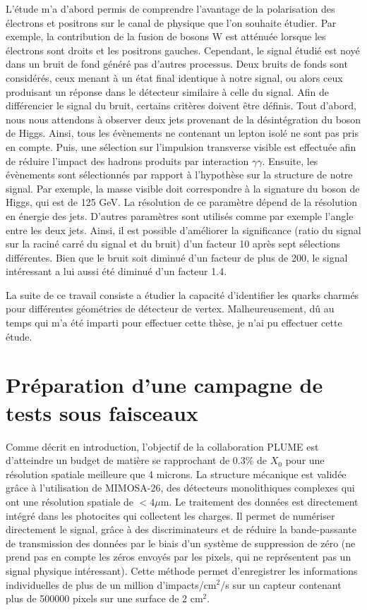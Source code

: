 \documentclass[a4papper, 10pt]{article}
\begin{document}
  L'étude m'a d'abord permis de comprendre l'avantage de la polarisation des électrons et positrons sur le canal de physique que l'on souhaite étudier.
  Par exemple, la contribution de la fusion de bosons W est atténuée lorsque les électrons sont droits et les positrons gauches.
  Cependant, le signal étudié est noyé dans un bruit de fond généré pas d'autres processus.
  Deux bruits de fonds sont considérés, ceux menant à un état final identique à notre signal, ou alors ceux produisant un réponse dans le détecteur similaire à celle du signal.
  Afin de différencier le signal du bruit, certains critères doivent être définis.
  Tout d'abord, nous nous attendons à observer deux jets provenant de la désintégration du boson de Higgs. 
  Ainsi, tous les évènements ne contenant un lepton isolé ne sont pas pris en compte.
  Puis, une sélection sur l'impulsion transverse visible est effectuée afin de réduire l'impact des hadrons produits par interaction $\gamma\gamma$.
  Ensuite, les évènements sont sélectionnés par rapport à l'hypothèse sur la structure de notre signal.
  Par exemple, la masse visible doit correspondre à la signature du boson de Higgs, qui est de 125 GeV.
  La résolution de ce paramètre dépend de la résolution en énergie des jets. 
  D'autres paramètres sont utilisés comme par exemple l'angle entre les deux jets.
  Ainsi, il est possible d'améliorer la significance (ratio du signal sur la raciné carré du signal et du bruit) d'un facteur 10 après sept sélections différentes.
  Bien que le bruit soit diminué d'un facteur de plus de 200, le signal intéressant a lui aussi été diminué d'un facteur 1.4.

  La suite de ce travail consiste a étudier la capacité d'identifier les quarks charmés pour différentes géométries de détecteur de vertex. 
  Malheureusement, dû au temps qui m'a été imparti pour effectuer cette thèse, je n'ai pu effectuer cette étude.

  \section{Préparation d'une campagne de tests sous faisceaux}

    Comme décrit en introduction, l'objectif de la collaboration PLUME est d'atteindre un budget de matière se rapprochant de 0.3\% de $X_0$ pour une résolution spatiale meilleure que 4 microns.
  La structure mécanique est validée grâce à l'utilisation de MIMOSA-26, des détecteurs monolithiques complexes qui ont une résolution spatiale de $< 4 \mu$m.
  Le traitement des données est directement intégré dans les photocites qui collectent les charges. 
  Il permet de numériser directement le signal, grâce à des discriminateurs et de réduire la bande-passante de transmission des données par le biais d'un système de suppression de zéro (ne prend pas en compte les zéros envoyés par les pixels, qui ne représentent pas un signal physique intéressant).
  Cette méthode permet d'enregistrer les informations individuelles de plus de un million d'impacts/cm$^2$/s sur un capteur contenant plus de 500000 pixels sur une surface de 2 cm$^2$.
  
\end{document}
